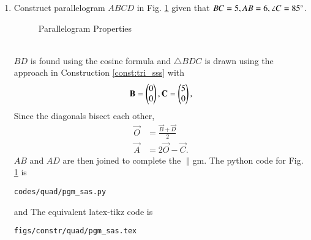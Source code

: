\renewcommand{\theequation}{\theenumi}
\begin{enumerate}[label=\thesubsection.\arabic*.,ref=\thesubsection.\theenumi]
%
\item Construct parallelogram $ABCD$ 	in Fig. \ref{fig:pgm_sas}	
given that  $BC = 5, AB = 6, \angle C = 85 \degree$.
\begin{figure}[!ht]
	\begin{center}
		\resizebox{\columnwidth}{!}{}
	\end{center}
	\caption{Parallelogram Properties}
	\label{fig:pgm_sas}	
\end{figure}
%
\\
\solution $BD$ is found using the cosine formula and $\triangle BDC$ is drawn using the approach in Construction \ref{const:tri_sss} with 
%
\begin{align}
\mathbf{B} = \begin{pmatrix}0\\0\end{pmatrix},
\mathbf{C} = \begin{pmatrix}5\\0\end{pmatrix},
\end{align}
%
Since the diagonals bisect each other, 
%
\begin{align}
\vec{O} &= \frac{\vec{B}+\vec{D}}{2}
\\
\vec{A} &= 2\vec{O} - \vec{C}.
\end{align}
%
$AB$ and $AD$ are then joined to complete the $\parallel$gm.
The python code for  Fig. \ref{fig:pgm_sas} is
\begin{lstlisting}
codes/quad/pgm_sas.py
\end{lstlisting}
%
and 
The equivalent latex-tikz code is
%
\begin{lstlisting}
figs/constr/quad/pgm_sas.tex
\end{lstlisting}
%


\end{enumerate}
